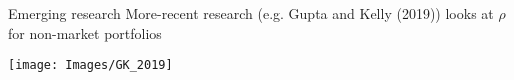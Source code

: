 \documentclass[xcolor=table, aspectratio=169]{beamer}
\begin{document}







\begin{frame}{Emerging research}
    More-recent research \footnotesize{(e.g. Gupta and Kelly (2019))} \normalsize{looks at $\rho$ for non-market portfolios}
    \begin{center}
\texttt{[image: Images/GK\_2019]}
\end{center}    
\end{frame}
\end{document}

